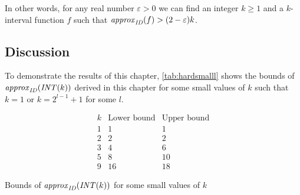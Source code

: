 In other words,
for any real number $\varepsilon > 0$
we can find an integer $k \geq 1$
and a $k$-interval function $f$
such that $\mathit{approx}_{\mathit{ID}} (f) > (2-\varepsilon) k$.

\subsection{Discussion}

To demonstrate the results of this chapter,
\cref{tab:hardsmalll} shows the bounds
of $\mathit{approx}_{\mathit{ID}} (\mathit{INT} (k))$ derived in this chapter
for some small values of $k$
such that $k=1$ or $k=2^{l-1}+1$ for some $l$.

\begin{table}[h]
\centering
$$\begin{array}{c|cc}
k %
& \text{Lower bound}
& \text{Upper bound}
\\
\hline
1 & 1 & 1 \\
2 & 2 & 2 \\ %
\hline
3 & 4 & 6 \\ %
5 & 8 & 10 \\ %
9 & 16 & 18 %
\end{array}$$
\caption{Bounds of $\mathit{approx}_{\mathit{ID}} (\mathit{INT} (k))$ for some small values of $k$}
\label{tab:hardsmalll}
\end{table}

